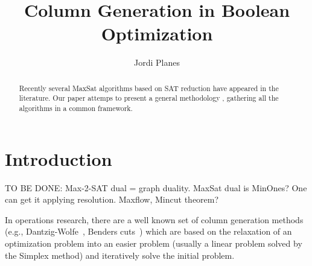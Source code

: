 \documentclass[runningheads,a4paper]{llncs}
\title{Column Generation in Boolean Optimization}
\author{Jordi Planes}
\institute{Universitat de Lleida}
\begin{document}
\maketitle

\begin{abstract}
Recently several MaxSat algorithms based on SAT reduction have
appeared in the literature. Our paper attemps to present a general
methodology , gathering all the algorithms in a common framework.


\end{abstract}


\section{Introduction}\label{sec:intro}

TO BE DONE: Max-2-SAT dual = graph duality. MaxSat dual is MinOnes?
One can get it applying resolution.
Maxflow, Mincut theorem?

In operations research, there are a well known set of column
generation methods (e.g., Dantzig-Wolfe~\cite{dantzig-wolfe},
Benders cuts~\cite{benders62}) which are based on
the relaxation of an optimization problem into an easier problem
(usually a linear problem solved by the Simplex method) and
iteratively solve the initial problem.
\end{document}
